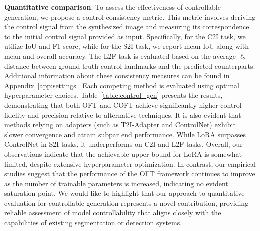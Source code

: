 {\textbf{Quantitative comparison}. To assess the effectiveness of controllable generation, we propose a control consistency metric. This metric involves deriving the control signal from the synthesized image and measuring its correspondence to the initial control signal provided as input. Specifically, for the C2I task, we utilize IoU and F1 score, while for the S2I task, we report mean IoU along with mean and overall accuracy. The L2F task is evaluated based on the average $\ell_2$ distance between ground truth control landmarks and the predicted counterparts. Additional information about these consistency measures can be found in Appendix~\ref{app:settings}. Each competing method is evaluated using optimal hyperparameter choices. Table~\ref{table:control_gen} presents the results, demonstrating that both OFT and COFT achieve significantly higher control fidelity and precision relative to alternative techniques. It is also evident that methods relying on adapters (such as T2I-Adapter and ControlNet) exhibit slower convergence and attain subpar end performance. While LoRA surpasses ControlNet in S2I tasks, it underperforms on C2I and L2F tasks. Overall, our observations indicate that the achievable upper bound for LoRA is somewhat limited, despite extensive hyperparameter optimization. In contrast, our empirical studies suggest that the performance of the OFT framework continues to improve as the number of trainable parameters is increased, indicating no evident saturation point. We would like to highlight that our approach to quantitative evaluation for controllable generation represents a novel contribution, providing reliable assessment of model controllability that aligns closely with the capabilities of existing segmentation or detection systems.

}
